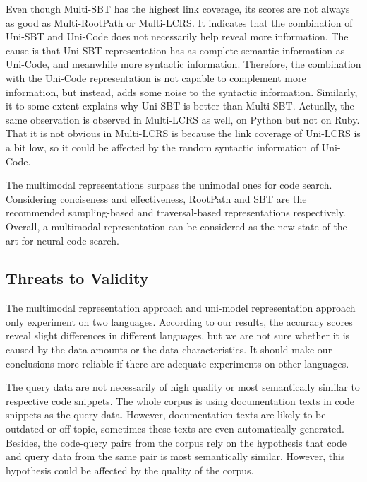 \documentclass[conference]{IEEEtran}
\begin{document}
Even though Multi-SBT has the highest link coverage, its scores are not always as good as Multi-RootPath or Multi-LCRS. It indicates that the combination of Uni-SBT and Uni-Code does not necessarily help reveal more information. The cause is that Uni-SBT representation has as complete semantic information as Uni-Code, and meanwhile more syntactic information. Therefore, the combination with the Uni-Code representation is not capable to complement more information, but instead, adds some noise to the syntactic information. Similarly, it to some extent explains why Uni-SBT is better than Multi-SBT. Actually, the same observation is observed in Multi-LCRS as well, on Python but not on Ruby. That it is not obvious in Multi-LCRS is because the link coverage of Uni-LCRS is a bit low, so it could be affected by the random syntactic information of Uni-Code.





\begin{tcolorbox}[fonttitle=\bfseries,title={Answer to Research Question 3}]
  \textbf{\rqccc}
  \tcblower
  The multimodal representations surpass the unimodal ones for code search. Considering conciseness and effectiveness, RootPath and SBT are the recommended sampling-based and traversal-based representations respectively.
  Overall, a multimodal representation can be considered as the new state-of-the-art for neural code search.
\end{tcolorbox}

\subsection{Threats to Validity}
\label{sec:discussion}

The multimodal representation approach and uni-model representation approach only experiment on two languages. According to our results, the accuracy scores reveal slight differences in different languages, but we are not sure whether it is caused by the data amounts or the data characteristics. It should make our conclusions more reliable if there are adequate experiments on other languages.

The query data are not necessarily of high quality or most semantically similar to respective code snippets. The whole corpus is using documentation texts in code snippets as the query data. However, documentation texts are likely to be outdated or off-topic, sometimes these texts are even automatically generated. Besides, the code-query pairs from the corpus rely on the hypothesis that code and query data from the same pair is most semantically similar. However, this hypothesis could be affected by the quality of the corpus.
\end{document}
